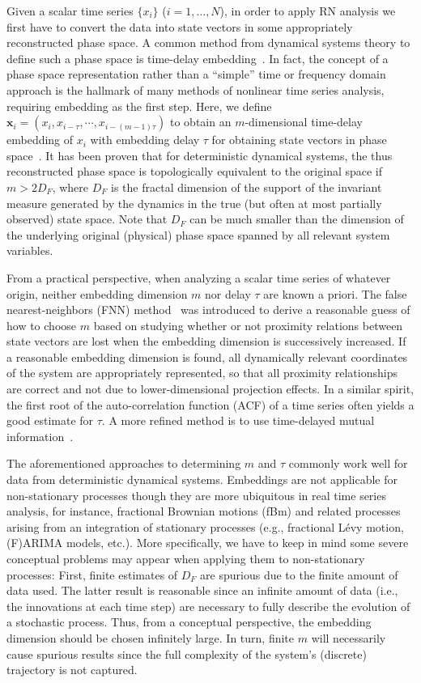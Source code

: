 		Given a scalar time series $\{x_i\}$ ($i=1,\dots,N$), in order to apply RN analysis we first have to convert the data into state vectors in some appropriately reconstructed phase space. A common method from dynamical systems theory to define such a phase space is time-delay embedding~\cite{Takens1981}. In fact, the concept of a phase space representation rather than a ``simple'' time or frequency domain approach is the hallmark of many methods of nonlinear time series analysis, requiring embedding as the first step. Here, we define $\mathbf{x}_i = (x_i, x_{i-\tau}, \cdots, x_{i-(m-1)\tau})$ to obtain an $m$-dimensional time-delay embedding of $x_i$ with embedding delay $\tau$ for obtaining state vectors in phase space~\cite{Takens1981}. It has been proven that for deterministic dynamical systems, the thus reconstructed phase space is topologically equivalent to the original space if $m > 2 D_F$, where $D_F$ is the fractal dimension of the support of the invariant measure generated by the dynamics in the true (but often at most partially observed) state space. Note that $D_F$ can be much smaller than the dimension of the underlying original (physical) phase space spanned by all relevant system variables.

		From a practical perspective, when analyzing a scalar time series of whatever origin, neither embedding dimension $m$ nor delay $\tau$ are known a priori. The false nearest-neighbors (FNN) method~\cite{Kennel1992} was introduced to derive a reasonable guess of how to choose $m$ based on studying whether or not proximity relations between state vectors are lost when the embedding dimension is successively increased. If a reasonable embedding dimension is found, all dynamically relevant coordinates of the system are appropriately represented, so that all proximity relationships are correct and not due to lower-dimensional projection effects. In a similar spirit, the first root of the auto-correlation function (ACF) of a time series often yields a good estimate for $\tau$. A more refined method is to use time-delayed mutual information~\cite{Fraser1986}.

		The aforementioned approaches to determining $m$ and $\tau$ commonly work well for data from deterministic dynamical systems. Embeddings are not applicable for non-stationary processes though they are more ubiquitous in real time series analysis, for instance, fractional Brownian motions (fBm) and related processes arising from an integration of stationary processes (e.g., fractional L\'evy motion, (F)ARIMA models, etc.). More specifically, we have to keep in mind some severe conceptual problems may appear when applying them to non-stationary processes: First, finite estimates of $D_F$ are spurious due to the finite amount of data used. The latter result is reasonable since an infinite amount of data (i.e., the innovations at each time step) are necessary to fully describe the evolution of a stochastic process. Thus, from a conceptual perspective, the embedding dimension should be chosen infinitely large. In turn, finite $m$ will necessarily cause spurious results since the full complexity of the system's (discrete) trajectory is not captured.
		

